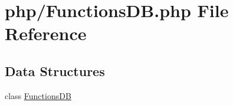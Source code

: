 \hypertarget{php_2_functions_d_b_8php}{}\section{php/\+Functions\+D\+B.php File Reference}
\label{php_2_functions_d_b_8php}
\subsection*{Data Structures}
\begin{DoxyCompactItemize}
\item 
class \hyperlink{class_functions_d_b}{Functions\+D\+B}
\end{DoxyCompactItemize}
